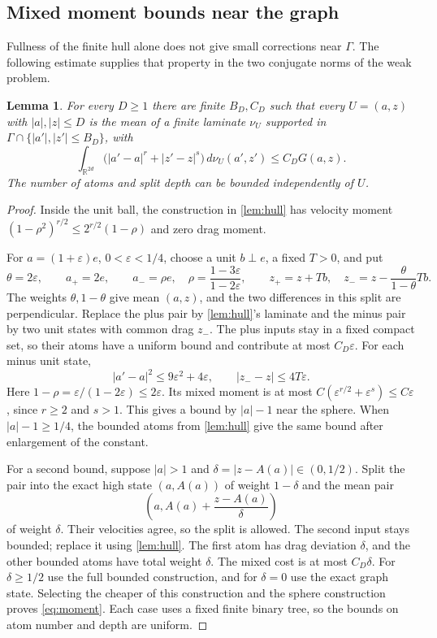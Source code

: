 \documentclass[11pt]{article}
\newtheorem{lemma}[lemma]{Lemma}
\theoremstyle{remark}
\newcommand{\R}{\mathbb R}
\begin{document}
\subsection{Mixed moment bounds near the graph}
Fullness of the finite hull alone does not give small corrections near
$\Gamma$. The following estimate supplies that property in the two
conjugate norms of the weak problem.

\begin{lemma}\label{lem:tight}
For every $D\ge1$ there are finite $B_D,C_D$ such that every
$U=(a,z)$ with $|a|,|z|\le D$ is the mean of a finite laminate
$\nu_U$ supported in $\Gamma\cap\{|a'|,|z'|\le B_D\}$, with
\begin{equation}\label{eq:moment}
 \int_{\R^{2d}}\big(|a'-a|^r+|z'-z|^s\big)\,d\nu_U(a',z')
 \le C_D G(a,z).
\end{equation}
The number of atoms and split depth can be bounded independently of $U$.
\end{lemma}
\begin{proof}
Inside the unit ball, the construction in \cref{lem:hull} has velocity
moment $(1-\rho^2)^{r/2}\le2^{r/2}(1-\rho)$ and zero drag moment.

For $a=(1+\varepsilon)e$, $0<\varepsilon<1/4$, choose a unit
$b\perp e$, a fixed $T>0$, and put
\[
 \theta=2\varepsilon,\qquad
 a_+=2e,\qquad
 a_-=\rho e,\quad \rho=\frac{1-3\varepsilon}{1-2\varepsilon},
 \qquad z_+=z+Tb,\quad
 z_-=z-\frac{\theta}{1-\theta}Tb.
\]
The weights $\theta,1-\theta$ give mean $(a,z)$, and the two
differences in this split are perpendicular. Replace the plus pair by
\cref{lem:hull}'s laminate and the minus pair by two unit states
with common drag $z_-$. The plus inputs stay in a fixed compact set,
so their atoms have a uniform bound and contribute at most
$C_D\varepsilon$. For each minus unit state,
\[
 |a'-a|^2\le9\varepsilon^2+4\varepsilon,\qquad
 |z_--z|\le4T\varepsilon.
\]
Here $1-\rho=\varepsilon/(1-2\varepsilon)\le2\varepsilon$.
Its mixed moment is at most
$C(\varepsilon^{r/2}+\varepsilon^s)\le C\varepsilon$, since
$r\ge2$ and $s>1$. This gives a bound by $|a|-1$ near the sphere.
When $|a|-1\ge1/4$, the bounded atoms from \cref{lem:hull} give
the same bound after enlargement of the constant.

For a second bound, suppose $|a|>1$ and
$\delta=|z-A(a)|\in(0,1/2)$. Split the pair into the exact high
state $(a,A(a))$ of weight $1-\delta$ and the mean pair
\[
 \left(a,A(a)+\frac{z-A(a)}\delta\right)
\]
of weight $\delta$. Their velocities agree, so the split is allowed.
The second input stays bounded; replace it using \cref{lem:hull}.
The first atom has drag deviation $\delta$, and the other bounded
atoms have total weight $\delta$. The mixed cost is at most
$C_D\delta$. For $\delta\ge1/2$ use the full bounded construction,
and for $\delta=0$ use the exact graph state. Selecting the cheaper
of this construction and the sphere construction proves \eqref{eq:moment}.
Each case uses a fixed finite binary tree, so the bounds on atom number
and depth are uniform.
\end{proof}
\end{document}
